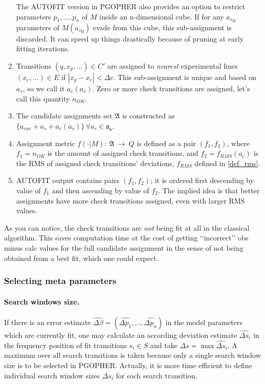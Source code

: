 \documentclass[11pt]{article}
\begin{document}
\begin{enumerate}
The AUTOFIT version in PGOPHER also provides an option to restrict parameters $p_1, ..., p_n$ of $M$ inside an n-dimensional cube. If for any ${a_s}_0$ parameters of $M({a_s}_0)$ evade from this cube, this sub-assignment is discarded.  It can speed up things drastically because of pruning at early fitting iterations.    
		\item Transitions $(q, x_p, ...) \in C'$ are assigned to \emph{nearest} experimental lines $(x_e, ...) \in E$ if $|x_p - x_e| < \Delta c$. This sub-assignment is unique and based on $a_s$, so we call it $a_c(a_s)$. Zero or more check transitions are assigned, let's call this quantity $n_{OK}$.
		\item  The candidate assignments set $\mathfrak{A}$ is constructed as $\{a_{cur} + a_s + a_c(a_s)\}\,\forall a_s \in \mathfrak{a_s}$.
	\item Assignment metric $f(\cdot | M):~\mathfrak{A}~\rightarrow~Q$ is defined as a pair $(f_1, f_2)$, where $f_1 = n_{OK}$ is the amount of assigned check transitions, and $f_2 = f_{RMS}(a_c)$ is the RMS of assigned check transitions' deviations, $f_{RMS}$ defined in \ref{def_rms}. 
	\item AUTOFIT output contains pairs $(f_1, f_2)$; it is ordered first descending by value of $f_1$ and then ascending by value of $f_2$. The implied idea is that better assignments have more check transitions assigned, even with larger RMS values. 
\end{enumerate}

As you can notice, the check transitions are \emph{not} being fit at all in the classical algorithm. This saves computation time at the cost of getting \lq\lq{}incorrect\rq\rq{} obs minus calc values for the full candidate assignment in the sense of not being obtained from a best fit, which one could expect.


\subsubsection{Selecting meta parameters}

\paragraph{Search windows size.}

If there is an error estimate $\widehat {\Delta \beta} = (\widehat {\Delta p_1}, ..., \widehat {\Delta p_n})$ in the model parameters which are currently fit, one may calculate an according deviation estimate $\widehat {\Delta s}_i$ in the frequency position of fit transitions  $s_i \in S$ and take $\Delta s = \max \widehat {\Delta s}_i$. %
A maximum over all search transitions is taken because only a single search window size is to be selected in PGOPHER. Actually, it is more time efficient to define individual search window sizes $\Delta s_i$ for each search transition.
\end{document}
